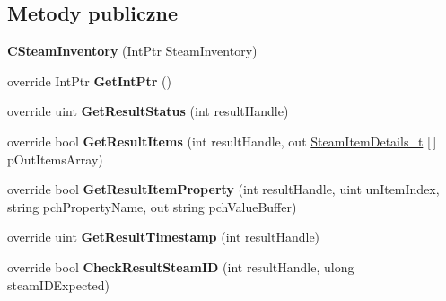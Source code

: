 \subsection*{Metody publiczne}
\begin{DoxyCompactItemize}
\item 
\mbox{\label{class_valve_1_1_steamworks_1_1_c_steam_inventory_ac8c94b9abd42a4bcf13f7843d61542b0}} 
{\bfseries C\+Steam\+Inventory} (Int\+Ptr Steam\+Inventory)
\item 
\mbox{\label{class_valve_1_1_steamworks_1_1_c_steam_inventory_ac898a252dcb15d49ea8bc05225d37138}} 
override Int\+Ptr {\bfseries Get\+Int\+Ptr} ()
\item 
\mbox{\label{class_valve_1_1_steamworks_1_1_c_steam_inventory_a7992ee22d0a2e3dc51c8d3e9a2a352e0}} 
override uint {\bfseries Get\+Result\+Status} (int result\+Handle)
\item 
\mbox{\label{class_valve_1_1_steamworks_1_1_c_steam_inventory_a9693939579c3007ad118fbc1e1ee1fad}} 
override bool {\bfseries Get\+Result\+Items} (int result\+Handle, out \hyperlink{struct_valve_1_1_steamworks_1_1_steam_item_details__t}{Steam\+Item\+Details\+\_\+t} \mbox{[}$\,$\mbox{]} p\+Out\+Items\+Array)
\item 
\mbox{\label{class_valve_1_1_steamworks_1_1_c_steam_inventory_ab0f34f8724c44481ab943f4b390debea}} 
override bool {\bfseries Get\+Result\+Item\+Property} (int result\+Handle, uint un\+Item\+Index, string pch\+Property\+Name, out string pch\+Value\+Buffer)
\item 
\mbox{\label{class_valve_1_1_steamworks_1_1_c_steam_inventory_a3f9c87537faca2e398d22e09b93776d9}} 
override uint {\bfseries Get\+Result\+Timestamp} (int result\+Handle)
\item 
\mbox{\label{class_valve_1_1_steamworks_1_1_c_steam_inventory_a84ea1c6270e22785ca032ae46d000b02}} 
override bool {\bfseries Check\+Result\+Steam\+ID} (int result\+Handle, ulong steam\+I\+D\+Expected)

\end{DoxyCompactItemize}

